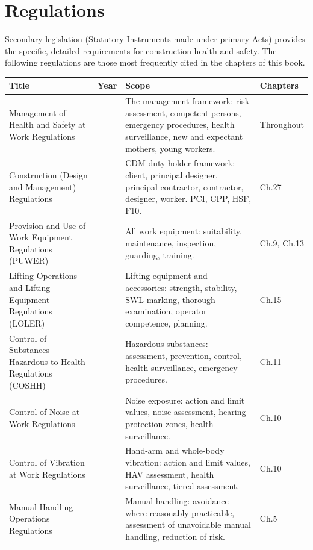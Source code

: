 \section{Regulations}

Secondary legislation (Statutory Instruments made under primary Acts) provides the specific, detailed requirements for construction health and safety. The following regulations are those most frequently cited in the chapters of this book.

\begin{table}[H]
\centering
\small
\begin{tabularx}{\textwidth}{>{\raggedright\arraybackslash}p{4.8cm}>{\centering\arraybackslash}p{0.9cm}>{\raggedright\arraybackslash}p{4.2cm}>{\raggedright\arraybackslash}X}
\toprule
\textbf{Title} & \textbf{Year} & \textbf{Scope} & \textbf{Chapters} \\
\midrule
Management of Health and Safety at Work Regulations & 1999 & The management framework: risk assessment, competent persons, emergency procedures, health surveillance, new and expectant mothers, young workers. & Throughout \\
\midrule
Construction (Design and Management) Regulations & 2015 & CDM duty holder framework: client, principal designer, principal contractor, contractor, designer, worker. PCI, CPP, HSF, F10. & Ch.27 \\
\midrule
Provision and Use of Work Equipment Regulations (PUWER) & 1998 & All work equipment: suitability, maintenance, inspection, guarding, training. & Ch.9, Ch.13 \\
\midrule
Lifting Operations and Lifting Equipment Regulations (LOLER) & 1998 & Lifting equipment and accessories: strength, stability, SWL marking, thorough examination, operator competence, planning. & Ch.15 \\
\midrule
Control of Substances Hazardous to Health Regulations (COSHH) & 2002 & Hazardous substances: assessment, prevention, control, health surveillance, emergency procedures. & Ch.11 \\
\midrule
Control of Noise at Work Regulations & 2005 & Noise exposure: action and limit values, noise assessment, hearing protection zones, health surveillance. & Ch.10 \\
\midrule
Control of Vibration at Work Regulations & 2005 & Hand-arm and whole-body vibration: action and limit values, HAV assessment, health surveillance, tiered assessment. & Ch.10 \\
\midrule
Manual Handling Operations Regulations & 1992 & Manual handling: avoidance where reasonably practicable, assessment of unavoidable manual handling, reduction of risk. & Ch.5 \\

\end{tabularx}
\end{table}
